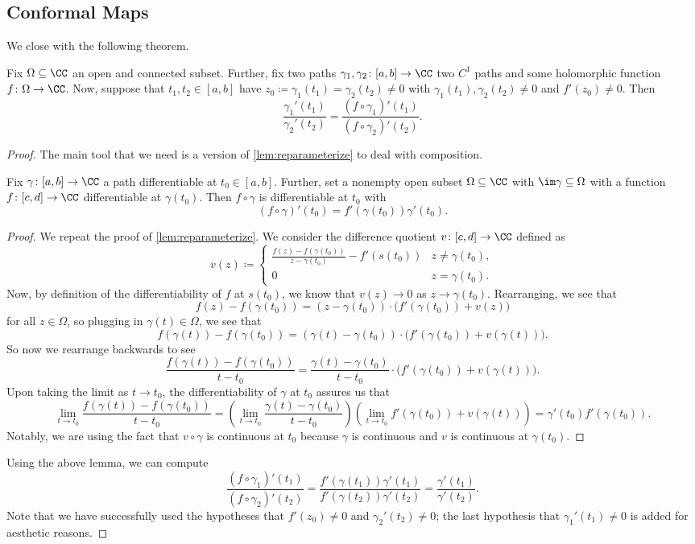 \documentclass[../notes.tex]{subfiles}
\begin{document}
\subsection{Conformal Maps}
We close with the following theorem.
\begin{theorem} \label{thm:getconformal}
	Fix $\Omega\subseteq\CC$ an open and connected subset. Further, fix two paths $\gamma_1,\gamma_2\colon [a,b]\to\CC$ two $C^1$ paths and some holomorphic function $f\colon \Omega\to\CC$. Now, suppose that $t_1,t_2\in[a,b]$ have $z_0\coloneqq \gamma_1(t_1)=\gamma_2(t_2)\ne0$ with $\gamma_1(t_1),\gamma_2(t_2)\ne0$ and $f'(z_0)\ne0$. Then
	\[\frac{\gamma_1'(t_1)}{\gamma_2'(t_2)}=\frac{(f\circ\gamma_1)'(t_1)}{(f\circ\gamma_2)'(t_2)}.\]
\end{theorem}
\begin{proof}
	The main tool that we need is a version of \autoref{lem:reparameterize} to deal with composition.
	\begin{lemma}
		Fix $\gamma\colon [a,b]\to\CC$ a path differentiable at $t_0\in[a,b]$. Further, set a nonempty open subset $\Omega\subseteq\CC$ with $\im\gamma\subseteq\Omega$ with a function $f\colon [c,d]\to\CC$ differentiable at $\gamma(t_0)$. Then $f\circ\gamma$ is differentiable at $t_0$ with
		\[(f\circ\gamma)'(t_0)=f'(\gamma(t_0))\gamma'(t_0).\]
	\end{lemma}
	\begin{proof}
		We repeat the proof of \autoref{lem:reparameterize}. We consider the difference quotient $v\colon [c,d]\to\CC$ defined as
		\[v(z)\coloneqq \begin{cases}
			\frac{f(z)-f(\gamma(t_0))}{z-\gamma(t_0)}-f'(s(t_0)) & z\ne\gamma(t_0), \\
			0 & z=\gamma(t_0).
		\end{cases}\]
		Now, by definition of the differentiability of $f$ at $s(t_0)$, we know that $v(z)\to0$ as $z\to\gamma(t_0)$. Rearranging, we see that
		\[f(z)-f(\gamma(t_0))=(z-\gamma(t_0))\cdot\big(f'(\gamma(t_0))+v(z)\big)\]
		for all $z\in\Omega$, so plugging in $\gamma(t)\in\Omega$, we see that
		\[f(\gamma(t))-f(\gamma(t_0))=(\gamma(t)-\gamma(t_0))\cdot\big(f'(\gamma(t_0))+v(\gamma(t))\big).\]
		So now we rearrange backwards to see
		\[\frac{f(\gamma(t))-f(\gamma(t_0))}{t-t_0}=\frac{\gamma(t)-\gamma(t_0)}{t-t_0}\cdot\big(f'(\gamma(t_0))+v(\gamma(t))\big).\]
		Upon taking the limit as $t\to t_0$, the differentiability of $\gamma$ at $t_0$ assures us that
		\[\lim_{t\to t_0}\frac{f(\gamma(t))-f(\gamma(t_0))}{t-t_0}=\left(\lim_{t\to t_0}\frac{\gamma(t)-\gamma(t_0)}{t-t_0}\right)\left(\lim_{t\to t_0}f'(\gamma(t_0))+v(\gamma(t))\right)=\gamma'(t_0)f'(\gamma(t_0)).\]
		Notably, we are using the fact that $v\circ\gamma$ is continuous at $t_0$ because $\gamma$ is continuous and $v$ is continuous at $\gamma(t_0)$.
	\end{proof}
	Using the above lemma, we can compute
	\[\frac{(f\circ\gamma_1)'(t_1)}{(f\circ\gamma_2)'(t_2)}=\frac{f'(\gamma(t_1))\gamma'(t_1)}{f'(\gamma(t_2))\gamma'(t_2)}=\frac{\gamma'(t_1)}{\gamma'(t_2)}.\]
	Note that we have successfully used the hypotheses that $f'(z_0)\ne0$ and $\gamma_2'(t_2)\ne0$; the last hypothesis that $\gamma_1'(t_1)\ne0$ is added for aesthetic reasons.
\end{proof}
\end{document}
